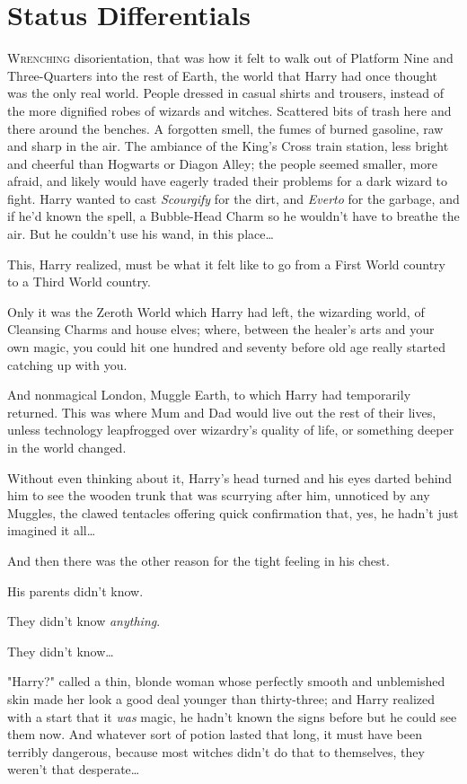 \chapter{Status Differentials}

\lettrine{W}{renching}
disorientation, that was how it felt to walk out of Platform Nine and
Three-Quarters into the rest of Earth, the world that Harry had once thought
was the only real world. People dressed in casual shirts and trousers, instead of
the more dignified robes of wizards and witches. Scattered bits of trash here
and there around the benches. A forgotten smell, the fumes of burned gasoline,
raw and sharp in the air. The ambiance of the King's Cross train station, less
bright and cheerful than Hogwarts or Diagon Alley; the people seemed smaller,
more afraid, and likely would have eagerly traded their problems for a dark
wizard to fight. Harry wanted to cast \emph{Scourgify} for the dirt, and
\emph{Everto} for the garbage, and if he'd known the spell, a Bubble-Head Charm
so he wouldn't have to breathe the air. But he couldn't use his wand, in this
place…

This, Harry realized, must be what it felt like to go from a First World
country to a Third World country.

Only it was the Zeroth World which Harry had left, the wizarding world, of
Cleansing Charms and house elves; where, between the healer's arts and your own
magic, you could hit one hundred and seventy before old age really started
catching up with you.

And nonmagical London, Muggle Earth, to which Harry had temporarily returned.
This was where Mum and Dad would live out the rest of their lives, unless
technology leapfrogged over wizardry's quality of life, or something deeper in
the world changed.

Without even thinking about it, Harry's head turned and his eyes darted behind
him to see the wooden trunk that was scurrying after him, unnoticed by any
Muggles, the clawed tentacles offering quick confirmation that, yes, he hadn't
just imagined it all…

And then there was the other reason for the tight feeling in his chest.

His parents didn't know.

They didn't know \emph{anything}.

They didn't know…

"Harry?" called a thin, blonde woman whose perfectly smooth and unblemished
skin made her look a good deal younger than thirty-three; and Harry realized
with a start that it \emph{was} magic, he hadn't known the signs before but he
could see them now. And whatever sort of potion lasted that long, it must have
been terribly dangerous, because most witches didn't do that to themselves,
they weren't that desperate…

